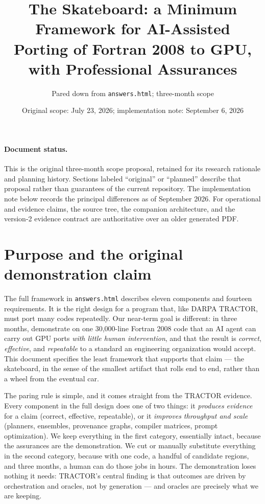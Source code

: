 \documentclass[11pt]{article}
\title{\vspace{-1.2em}The Skateboard: a Minimum Framework for AI-Assisted\\ Porting of Fortran 2008 to GPU, with Professional Assurances\vspace{-0.4em}}
\author{Pared down from \texttt{answers.html}; three-month scope}
\date{Original scope: July 23, 2026; implementation note: September 6, 2026}
\begin{document}
\maketitle
\vspace{-1.5em}

\paragraph{Document status.}
This is the original three-month scope proposal, retained for its research
rationale and planning history. Sections labeled ``original'' or ``planned''
describe that proposal rather than guarantees of the current repository. The
implementation note below records the principal differences as of September
2026. For operational and evidence claims, the source tree, the companion
architecture, and the version-2 evidence contract are authoritative over an
older generated PDF.

\section{Purpose and the original demonstration claim}

The full framework in \texttt{answers.html} describes eleven components and fourteen requirements. It is the right design for a program that, like DARPA TRACTOR, must port many codes repeatedly. Our near-term goal is different: in three months, demonstrate on one 30{,}000-line Fortran 2008 code that an AI agent can carry out GPU ports \emph{with little human intervention}, and that the result is \emph{correct}, \emph{effective}, and \emph{repeatable} to a standard an engineering organization would accept. This document specifies the least framework that supports that claim --- the skateboard, in the sense of the smallest artifact that rolls end to end, rather than a wheel from the eventual car.

The paring rule is simple, and it comes straight from the TRACTOR evidence. Every component in the full design does one of two things: it \emph{produces evidence} for a claim (correct, effective, repeatable), or it \emph{improves throughput and scale} (planners, ensembles, provenance graphs, compiler matrices, prompt optimization). We keep everything in the first category, essentially intact, because the assurances are the demonstration. We cut or manually substitute everything in the second category, because with one code, a handful of candidate regions, and three months, a human can do those jobs in hours. The demonstration loses nothing it needs: TRACTOR's central finding is that outcomes are driven by orchestration and oracles, not by generation --- and oracles are precisely what we are keeping.
\end{document}
